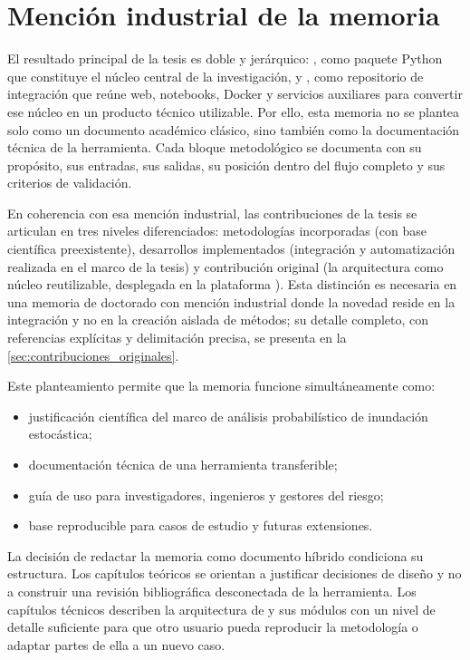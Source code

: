 \section{Mención industrial de la memoria}

El resultado principal de la tesis es doble y jerárquico: \pyhydra, como paquete Python que constituye el núcleo central de la investigación, y \hydra, como repositorio de integración que reúne web, notebooks, Docker y servicios auxiliares para convertir ese núcleo en un producto técnico utilizable. Por ello, esta memoria no se plantea solo como un documento académico clásico, sino también como la documentación técnica de la herramienta. Cada bloque metodológico se documenta con su propósito, sus entradas, sus salidas, su posición dentro del flujo completo y sus criterios de validación.

En coherencia con esa mención industrial, las contribuciones de la tesis se articulan en tres niveles diferenciados: metodologías incorporadas (con base científica preexistente), desarrollos implementados (integración y automatización realizada en el marco de la tesis) y contribución original (la arquitectura \pyhydra como núcleo reutilizable, desplegada en la plataforma \hydra). Esta distinción es necesaria en una memoria de doctorado con mención industrial donde la novedad reside en la integración y no en la creación aislada de métodos; su detalle completo, con referencias explícitas y delimitación precisa, se presenta en la \cref{sec:contribuciones_originales}.

Este planteamiento permite que la memoria funcione simultáneamente como:

\begin{itemize}
  \item justificación científica del marco de análisis probabilístico de inundación estocástica;
  \item documentación técnica de una herramienta transferible;
  \item guía de uso para investigadores, ingenieros y gestores del riesgo;
  \item base reproducible para casos de estudio y futuras extensiones.
\end{itemize}

La decisión de redactar la memoria como documento híbrido condiciona su estructura. Los capítulos teóricos se orientan a justificar decisiones de diseño y no a construir una revisión bibliográfica desconectada de la herramienta. Los capítulos técnicos describen la arquitectura de \hydra y sus módulos con un nivel de detalle suficiente para que otro usuario pueda reproducir la metodología o adaptar partes de ella a un nuevo caso.

